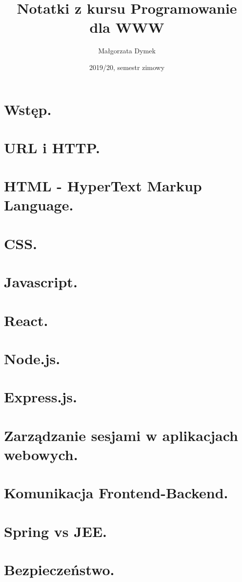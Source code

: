 \documentclass[a4paper]{article}
\title{Notatki z kursu Programowanie dla WWW}
\author{Małgorzata Dymek}
\date{2019/20, semestr zimowy}
\begin{document}
    \maketitle

    \section{Wstęp.}
    

    \section{URL i HTTP.}
    
    

    \section{HTML - HyperText Markup Language.}
    

    \section{CSS.}
    

    \section{Javascript.}
    

    \section{React.}
    

    \section{Node.js.}
    

    \section{Express.js.}
    

    \section{Zarządzanie sesjami w aplikacjach webowych.}
    

    \section{Komunikacja Frontend-Backend.}
    

    \section{Spring vs JEE.}
    

    \section{Bezpieczeństwo.}
    
\end{document}
